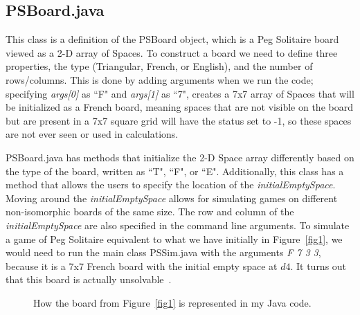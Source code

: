 \documentclass{article}
\begin{document}
\subsection{PSBoard.java}
\label{2.2PSBoard}
This class is a definition of the PSBoard object, which is a Peg Solitaire board viewed as a 2-D array of Spaces. To construct a board we need to define three properties, the type (Triangular, French, or English), and the number of rows/columns. This is done by adding arguments when we run the code; specifying \textit{args[0]} as ``F" and \textit{args[1]} as ``7", creates a 7x7 array of Spaces that will be initialized as a French board, meaning spaces that are not visible on the board but are present in a 7x7 square grid will have the status set to -1, so these spaces are not ever seen or used in calculations.

PSBoard.java has methods that initialize the 2-D Space array differently based on the type of the board, written as ``T", ``F", or ``E". Additionally, this class has a method that allows the users to specify the location of the \textit{initialEmptySpace}. Moving around the \textit{initialEmptySpace} allows for simulating games on different non-isomorphic boards of the same size. The row and column of the \textit{initialEmptySpace} are also specified in the command line arguments. To simulate a game of Peg Solitaire equivalent to what we have initially in Figure~\ref{fig1}, we would need to run the main class PSSim.java with the arguments \textit{F 7 3 3}, because it is a 7x7 French board with the initial empty space at $d4$. It turns out that this board is actually unsolvable~\cite{Brassine}.

\begin{figure}[htb]
\centering
{}
\hspace{.1\textwidth}
\caption{How the board from Figure~\ref{fig1} is represented in my Java code.}
\label{fig3}
\end{figure}
\end{document}
